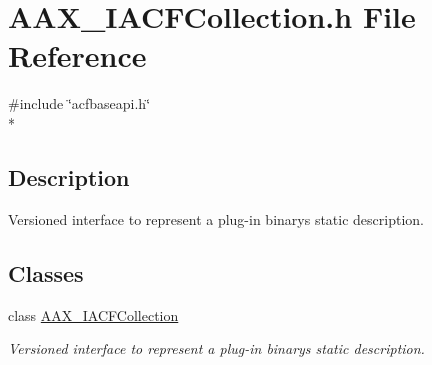 \hypertarget{a00217}{}\section{A\+A\+X\+\_\+\+I\+A\+C\+F\+Collection.\+h File Reference}
\label{a00217}
{\ttfamily \#include \char`\"{}acfbaseapi.\+h\char`\"{}}\\*


\subsection{Description}
Versioned interface to represent a plug-\/in binary\textquotesingle{}s static description. 

\subsection*{Classes}
\begin{DoxyCompactItemize}
\item 
class \hyperlink{a00049}{A\+A\+X\+\_\+\+I\+A\+C\+F\+Collection}
\begin{DoxyCompactList}\small\item\em Versioned interface to represent a plug-\/in binary\textquotesingle{}s static description. \end{DoxyCompactList}\end{DoxyCompactItemize}
